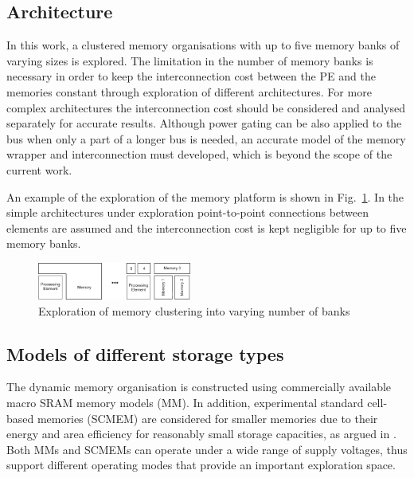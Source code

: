 \documentclass[a4paper,conference]{IEEEtran}
\begin{document}
\subsection{Architecture}

In this work, a clustered memory organisations with up to five memory banks of varying sizes is explored. The limitation in the number of memory banks is necessary in order to keep the interconnection cost between the PE and the memories constant through exploration of different architectures. For more complex architectures the interconnection cost should be considered and analysed separately for accurate results. Although power gating can be also applied to the bus when only a part of a longer bus is needed, an accurate model of the memory wrapper and interconnection must developed, which is beyond the scope of the current work. 

An example of the exploration of the memory platform is shown in Fig.~\ref{fig:platform}. In the simple architectures under exploration point-to-point connections between elements are assumed and the interconnection cost is kept negligible for up to five memory banks.

\begin{figure}[!t]
\centering
\includegraphics[width=0.45\textwidth]{Images/platform.eps}
\caption{Exploration of memory clustering into varying number of banks}
\label{fig:platform}
\end{figure}

\subsection{Models of different storage types}

The dynamic memory organisation is constructed using commercially available macro SRAM memory models (MM). In addition, experimental standard cell-based memories (SCMEM) \cite{Mei11}  are  considered for smaller memories due to their energy and area efficiency for reasonably small storage capacities, as argued in \cite{Mei10}. Both MMs and SCMEMs can operate under a wide range of supply voltages, thus support different operating modes that provide an important exploration space.
\end{document}
